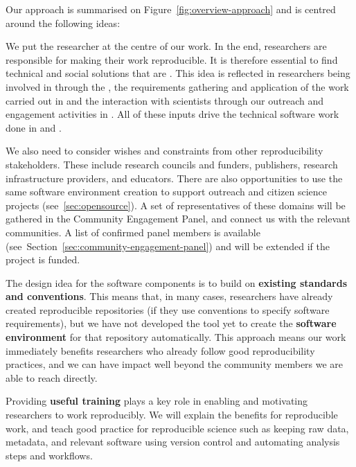 Our approach is summarised on Figure~\ref{fig:overview-approach} and is centred around the following ideas:
\begin{compactenum}
  \item We put the researcher at the centre of our work. In the end,
    researchers are responsible for making their work
    reproducible. It is therefore essential to find technical and social solutions
    that are . This idea is reflected in researchers
    being involved in  through the , the requirements gathering and application of the work carried out
  in  and the interaction with scientists through our
  outreach and engagement activities in . All of these inputs
  drive the technical software work done in  and .
\item We also need to consider wishes and constraints from other reproducibility
  stakeholders. These include research councils and funders, publishers, research
  infrastructure providers, and educators. There are also opportunities to use the same
  software environment creation to support outreach and
  citizen science projects (see~\ref{sec:opensource}). A set of representatives of
  these domains will be gathered in the Community Engagement Panel, and connect
  us with the relevant communities. A list of confirmed panel members is
  available (see~Section~\ref{sec:community-engagement-panel}) and will be
  extended if the project is funded.
\item The design idea for the software components is to build on \textbf{existing standards and
  conventions}. This means that, in many cases, researchers have already created reproducible
  repositories (if they use conventions to specify software requirements),
  but we have not developed the tool yet to create the \textbf{software environment} for that
  repository automatically.
  This approach means our work immediately benefits researchers who already follow good reproducibility practices,
  and we can have impact well beyond the community members we are able to reach directly.
\item Providing \textbf{useful training} plays a key role in enabling and motivating
  researchers to work reproducibly. We will explain the benefits for
  reproducible work, and teach good practice for reproducible science such as
  keeping raw data, metadata, and relevant software using version control and
  automating analysis steps and workflows.

\end{compactenum}
